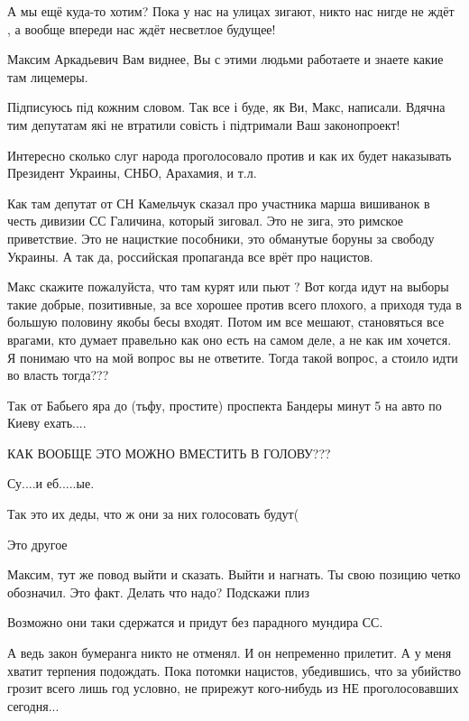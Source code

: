 \begin{itemize}

А мы ещё куда-то хотим? Пока у нас на улицах зигают, никто нас нигде не ждёт
, а вообще впереди нас ждёт несветлое будущее!


Максим Аркадьевич Вам виднее, Вы с этими людьми работаете и знаете какие там лицемеры.


Підписуюсь під кожним словом.
Так все і буде, як Ви, Макс, написали.
Вдячна тим депутатам які не втратили совість і підтримали Ваш законопроект!


Интересно сколько слуг народа проголосовало против и как их будет наказывать Президент Украины, СНБО, Арахамия, и т.л.


Как там депутат от СН Камельчук сказал про участника марша вишиванок в честь
дивизии СС Галичина, который зиговал.  Это не зига, это римское приветствие.
Это не нацисткие пособники, это обманутые боруны за свободу Украины.  А так да,
российская пропаганда все врёт про нацистов.


Макс скажите пожалуйста, что там курят или пьют ? Вот когда идут на выборы
такие добрые, позитивные, за все хорошее против всего плохого, а приходя туда в
большую половину якобы бесы входят. Потом им все мешают, становяться все
врагами, кто думает правельно как оно есть на самом деле, а не как им хочется.
Я понимаю что на мой вопрос вы не ответите. Тогда такой вопрос, а стоило идти
во власть тогда???


Так от Бабьего яра до (тьфу, простите) проспекта Бандеры минут 5 на авто по
Киеву ехать....

КАК ВООБЩЕ ЭТО МОЖНО ВМЕСТИТЬ В ГОЛОВУ???


Су....и еб.....ые.


Так это их деды, что ж они за них голосовать будут(


Это другое


Максим, тут же повод выйти и сказать. Выйти и нагнать. Ты свою позицию четко
обозначил. Это факт. Делать что надо? Подскажи плиз


Возможно они таки сдержатся и придут без парадного мундира СС.


А ведь закон бумеранга никто не отменял. И он непременно прилетит. А у меня
хватит терпения подождать. Пока потомки нацистов, убедившись, что за убийство
грозит всего лишь год условно, не прирежут кого-нибудь из НЕ проголосовавших
сегодня...

\end{itemize}
